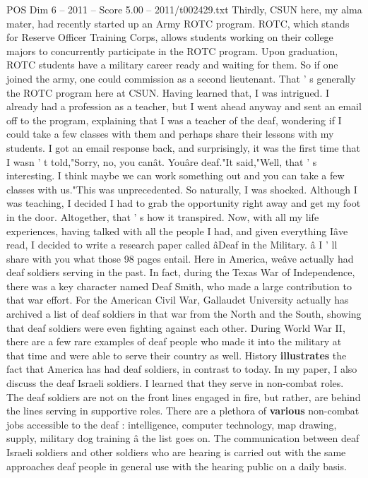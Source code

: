 \begin{textsample}{POS Dim 6 – 2011 – Score 5.00 – 2011/t002429.txt}
Thirdly, CSUN here, my alma mater, had recently started up an Army ROTC program.
ROTC, which stands for Reserve Officer Training Corps, allows students working on their college majors to concurrently participate in the ROTC program.
Upon graduation, ROTC students have a military career ready and waiting for them.
So if one joined the army, one could commission as a second lieutenant.
That ' s generally the ROTC program here at CSUN.
Having learned that, I was intrigued.
I already had a profession as a teacher, but I went ahead anyway and sent an email off to the program, explaining that I was a teacher of the deaf, wondering if I could take a few classes with them and perhaps share their lessons with my students.
I got an email response back, and surprisingly, it was the first time that I wasn ' t told,"Sorry, no, you canât.
Youâre deaf."It said,"Well, that ' s interesting.
I think maybe we can work something out and you can take a few classes with us."This was unprecedented.
So naturally, I was shocked.
Although I was teaching, I decided I had to grab the opportunity right away and get my foot in the door.
Altogether, that ' s how it transpired.
Now, with all my life experiences, having talked with all the people I had, and given everything Iâve read, I decided to write a research paper called âDeaf in the Military. â I ' ll share with you what those 98 pages entail.
Here in America, weâve actually had deaf soldiers serving in the past.
In fact, during the Texas War of Independence, there was a key character named Deaf Smith, who made a large contribution to that war effort.
For the American Civil War, Gallaudet University actually has archived a list of deaf soldiers in that war from the North and the South, showing that deaf soldiers were even fighting against each other.
During World War II, there are a few rare examples of deaf people who made it into the military at that time and were able to serve their country as well.
History \textbf{illustrates} the fact that America has had deaf soldiers, in contrast to today.
In my paper, I also discuss the deaf Israeli soldiers.
I learned that they serve in non-combat roles.
The deaf soldiers are not on the front lines engaged in fire, but rather, are behind the lines serving in supportive roles.
There are a plethora of \textbf{various} non-combat jobs accessible to the deaf : intelligence, computer technology, map drawing, supply, military dog training â the list goes on.
The communication between deaf Israeli soldiers and other soldiers who are hearing is carried out with the same approaches deaf people in general use with the hearing public on a daily basis.

\end{textsample}
